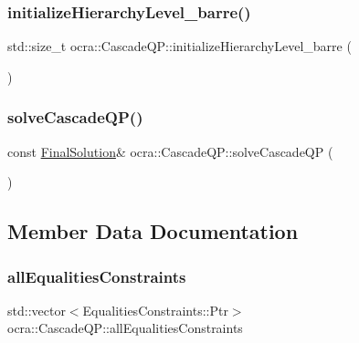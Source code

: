 \hypertarget{classocra_1_1CascadeQP_af18be26b3ac162b19f830306b8703813}{}\label{classocra_1_1CascadeQP_af18be26b3ac162b19f830306b8703813} 
\subsubsection{\texorpdfstring{initialize\+Hierarchy\+Level\+\_\+barre()}{initializeHierarchyLevel\_barre()}}
{\footnotesize\ttfamily std\+::size\+\_\+t ocra\+::\+Cascade\+Q\+P\+::initialize\+Hierarchy\+Level\+\_\+barre (\begin{DoxyParamCaption}{ }\end{DoxyParamCaption})\hspace{0.3cm}{\ttfamily [protected]}}

\hypertarget{classocra_1_1CascadeQP_a11e01b608414badd9af6794076eb8b33}{}\label{classocra_1_1CascadeQP_a11e01b608414badd9af6794076eb8b33} 
\subsubsection{\texorpdfstring{solve\+Cascade\+Q\+P()}{solveCascadeQP()}}
{\footnotesize\ttfamily const \hyperlink{structocra_1_1FinalSolution}{Final\+Solution}\& ocra\+::\+Cascade\+Q\+P\+::solve\+Cascade\+QP (\begin{DoxyParamCaption}{ }\end{DoxyParamCaption})}



\subsection{Member Data Documentation}
\hypertarget{classocra_1_1CascadeQP_a53b7452856aa410a83316214d3fe66ad}{}\label{classocra_1_1CascadeQP_a53b7452856aa410a83316214d3fe66ad} 
\subsubsection{\texorpdfstring{all\+Equalities\+Constraints}{allEqualitiesConstraints}}
{\footnotesize\ttfamily std\+::vector$<$Equalities\+Constraints\+::\+Ptr$>$ ocra\+::\+Cascade\+Q\+P\+::all\+Equalities\+Constraints\hspace{0.3cm}{\ttfamily [protected]}}



